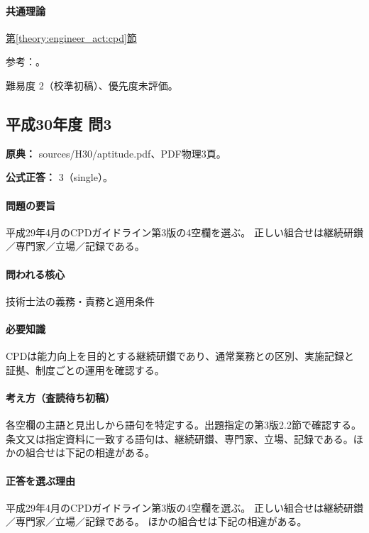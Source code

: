\paragraph{共通理論} \hyperref[theory:engineer_act:cpd]{第\ref*{theory:engineer_act:cpd}節}

\par 参考：\cite{cpd_v2}。

\par 難易度 2（校準初稿）、優先度未評価。

\subsection{平成30年度 問3}
\label{q:h30-reg-apt-03}

\noindent\textbf{原典：} sources/H30/aptitude.pdf、PDF物理3頁。

\textbf{公式正答：} 3（single）。

\paragraph{問題の要旨} 平成29年4月のCPDガイドライン第3版の4空欄を選ぶ。 正しい組合せは継続研鑚／専門家／立場／記録である。

\paragraph{問われる核心} 技術士法の義務・責務と適用条件

\paragraph{必要知識} CPDは能力向上を目的とする継続研鑚であり、通常業務との区別、実施記録と証拠、制度ごとの運用を確認する。

\paragraph{考え方（査読待ち初稿）} 各空欄の主語と見出しから語句を特定する。出題指定の第3版2.2節で確認する。 条文又は指定資料に一致する語句は、継続研鑚、専門家、立場、記録である。ほかの組合せは下記の相違がある。

\paragraph{正答を選ぶ理由} 平成29年4月のCPDガイドライン第3版の4空欄を選ぶ。 正しい組合せは継続研鑚／専門家／立場／記録である。 ほかの組合せは下記の相違がある。

